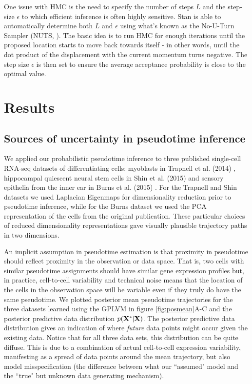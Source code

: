 One issue with HMC is the need to specify the number of steps $L$ and the step-size $\epsilon$ to which efficient inference is often highly sensitive. Stan is able to automatically determine both $L$ and $\epsilon$ using what's known as the No-U-Turn Sampler (NUTS, \cite{Hoffman2014-pl}). The basic idea is to run HMC for enough iterations until the proposed location starts to move back towards itself - in other words, until the dot product of the displacement with the current momentum turns negative. The step size $\epsilon$ is then set to ensure the average acceptance probability is close to the optimal value.




\section{Results}



\subsection{Sources of uncertainty in pseudotime inference}

We applied our probabilistic pseudotime inference to three published single-cell RNA-seq datasets of differentiating cells: myoblasts in Trapnell et al. (2014) \cite{Trapnell2014-xi}, hippocampal quiescent neural stem cells in Shin et al. (2015) \cite{Shin2015} and sensory epithelia from the inner ear in Burns et al. (2015) \cite{Burns2015}. For the Trapnell and Shin datasets we used Laplacian Eigenmaps \cite{Belkin2003} for dimensionality reduction prior to pseudotime inference, while for the Burns dataset we used the PCA representation of the cells from the original publication. These particular choices of reduced dimensionality representations gave visually plausible trajectory paths in two dimensions.

An implicit assumption in pseudotime estimation is that proximity in pseudotime should reflect proximity in the observation or data space. That is, two cells with similar pseudotime assignments should have similar gene expression profiles but, in practice, cell-to-cell variability and technical noise means that the location of the cells in the observation space will be variable even if they truly do have the same pseudotime. We plotted posterior mean pseudotime trajectories for the three datasets learned using the GPLVM in figure \ref{fig:posmean}A-C and the posterior predictive data distribution $p({\bf X}^*|{\bf X})$. The posterior predictive data distribution gives an indication of where \emph{future} data points might occur given the existing data. Notice that for all three data sets, this distribution can be quite diffuse. This is due to a combination of actual cell-to-cell expression variability, manifesting as a spread of data points around the mean trajectory, but also model misspecification (the difference between what our ``assumed" model and the ``true" but unknown data generating mechanism).


